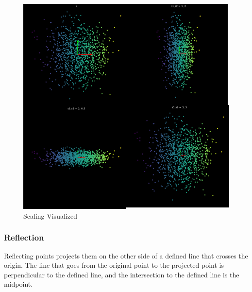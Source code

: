 \begin{figure}[h!]
\begin{center}
\includegraphics{students/SP19_DL_Lab_1_Notes/images/Scaling.png}
\caption{Scaling Visualized}
\label{fig:mon}
\end{center} 
\end{figure}
\FloatBarrier


\subsubsection{Reflection}
Reflecting points projects them on the other side of a defined line that crosses the origin. 
The line that goes from the original point to the projected point is perpendicular to the defined line, and the intersection to the defined line is the midpoint.


